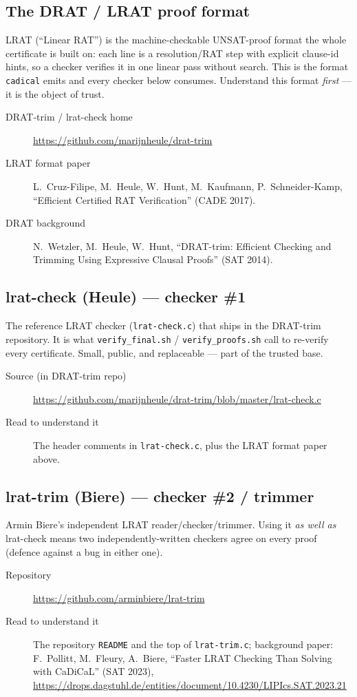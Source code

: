 \documentclass[11pt]{article}
\newcommand{\tool}[1]{\subsection{#1}}
\begin{document}
\tool{The DRAT / LRAT proof format}
LRAT (``Linear RAT'') is the machine-checkable UNSAT-proof format the whole
certificate is built on: each line is a resolution/RAT step with explicit
clause-id hints, so a checker verifies it in one linear pass without search.
This is the format \texttt{cadical} emits and every checker below consumes.
Understand this format \emph{first} --- it is the object of trust.
\begin{description}
  \item[DRAT-trim / lrat-check home] \url{https://github.com/marijnheule/drat-trim}
  \item[LRAT format paper] L.\ Cruz-Filipe, M.\ Heule, W.\ Hunt, M.\ Kaufmann,
        P.\ Schneider-Kamp, ``Efficient Certified RAT Verification'' (CADE 2017).
  \item[DRAT background] N.\ Wetzler, M.\ Heule, W.\ Hunt, ``DRAT-trim: Efficient
        Checking and Trimming Using Expressive Clausal Proofs'' (SAT 2014).
\end{description}

\tool{lrat-check (Heule) --- checker \#1}
The reference LRAT checker (\texttt{lrat-check.c}) that ships in the DRAT-trim
repository. It is what \texttt{verify\_final.sh} / \texttt{verify\_proofs.sh}
call to re-verify every certificate. Small, public, and replaceable --- part of
the trusted base.
\begin{description}
  \item[Source (in DRAT-trim repo)] \url{https://github.com/marijnheule/drat-trim/blob/master/lrat-check.c}
  \item[Read to understand it] The header comments in \texttt{lrat-check.c}, plus
        the LRAT format paper above.
\end{description}

\tool{lrat-trim (Biere) --- checker \#2 / trimmer}
Armin Biere's independent LRAT reader/checker/trimmer. Using it \emph{as well as}
lrat-check means two independently-written checkers agree on every proof
(defence against a bug in either one).
\begin{description}
  \item[Repository] \url{https://github.com/arminbiere/lrat-trim}
  \item[Read to understand it] The repository \texttt{README} and the top of
        \texttt{lrat-trim.c}; background paper: F.\ Pollitt, M.\ Fleury,
        A.\ Biere, ``Faster LRAT Checking Than Solving with CaDiCaL'' (SAT 2023),
        \url{https://drops.dagstuhl.de/entities/document/10.4230/LIPIcs.SAT.2023.21}
\end{description}
\end{document}
